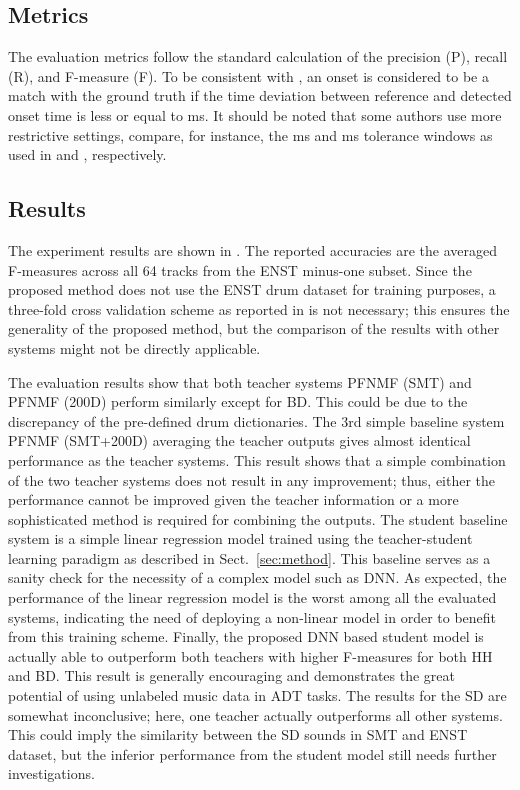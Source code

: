 \documentclass{article}
\begin{document}
\subsection{Metrics}
The evaluation metrics follow the standard calculation of the precision (P), recall (R), and F-measure (F). To be consistent with \cite{Gillet2008, Wu2015a, Southall2016}, an onset is considered to be a match with the ground truth if the time deviation between reference and detected onset time is less or equal to \unit[50]{ms}. It should be noted that some authors use more restrictive settings, compare, for instance, the \unit[30]{ms} and \unit[20]{ms} tolerance windows as used in \cite{Paulus2009a} and \cite{Vogl2017}, respectively.  

\subsection{Results}
The experiment results are shown in . The reported accuracies are the averaged F-measures across all 64 tracks from the ENST minus-one subset. Since the proposed method does not use the ENST drum dataset for training purposes, a three-fold cross validation scheme as reported in \cite{Paulus2009a, Wu2015a, Vogl2016, Vogl2017, Southall2016} is not necessary; this ensures the generality of the proposed method, but the comparison of the results with other systems might not be directly applicable.  

%

%
The evaluation results show that both teacher systems PFNMF (SMT) and PFNMF (200D) perform similarly except for BD. This could be due to the discrepancy of the pre-defined drum dictionaries. 
The 3rd simple baseline system PFNMF (SMT+200D) averaging the teacher outputs gives almost identical performance as the teacher systems. This result shows that a simple combination of the two teacher systems does not result in any improvement; thus, either the performance cannot be improved given the teacher information or a more sophisticated method is required for combining the outputs. 
The student baseline system is a simple linear regression model trained using the teacher-student learning paradigm as described in Sect.~\ref{sec:method}. This baseline serves as a sanity check for the necessity of a complex model such as DNN. As expected, the performance of the linear regression model is the worst among all the evaluated systems, indicating the need of deploying a non-linear model in order to benefit from this training scheme. 
Finally, the proposed DNN based student model is actually able to outperform both teachers with higher F-measures for both HH and BD. This result is generally encouraging and demonstrates the great potential of using unlabeled music data in ADT tasks. The results for the SD are somewhat inconclusive; here, one teacher actually outperforms all other systems. This could imply the similarity between the SD sounds in SMT and ENST dataset, but the inferior performance from the student model still needs further investigations. 
\end{document}
